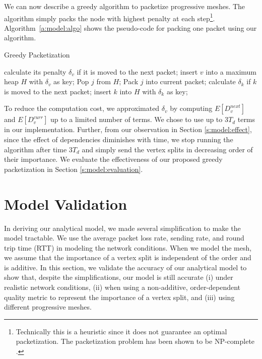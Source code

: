 We can now describe a greedy algorithm to packetize progressive meshes.
The algorithm simply packs the node with highest penalty
at each step\footnote{Technically this is a heuristic since it does not
guarantee an optimal packetization.  The packetization problem has been
shown to be NP-complete \cite{Gu:Packetization}.}.
Algorithm~\ref{a:model:algo} shows the pseudo-code for packing one packet using
our algorithm.

\begin{algorithm}
\caption{Greedy Packetization\label{a:model:algo}}
\begin{algorithmic}
    \STATE calculate its penalty $\delta_v$ if it is moved to the next packet;
    \STATE insert $v$ into a maximum heap $H$ with $\delta_v$ as key;
\ENDFOR
{}
\STATE Pop $j$ from $H$;
\STATE Pack $j$ into current packet;
    \STATE calculate $\delta_k$ if $k$ is moved to the next packet;
    \STATE insert $k$ into $H$ with $\delta_k$ as key;
\ENDFOR
\ENDWHILE
\end{algorithmic}
\end{algorithm}

To reduce the computation cost, we approximated $\delta_v$ by computing $E[D_v^{next}]$
and $E[D_v^{curr}]$ up to a limited number of terms.  We chose to use up to $3T_d$
terms in our implementation.  Further, from our observation in Section \ref{s:model:effect},
since the effect of dependencies diminishes with time, we stop running the algorithm
after time $3T_d$ and simply send the vertex splits in decreasing
order of their importance.  We evaluate the effectiveness of our proposed greedy packetization in Section \ref{s:model:evaluation}.

\section{Model Validation}
\label{s:model:experiment}

In deriving our analytical model, we made several 
simplification to make the model tractable.  We use the average
packet loss rate, sending rate, and round trip time (RTT) in modeling the network conditions.
When we model the mesh, we assume that the importance of a vertex split is 
independent of the order and is additive.  In this section, we validate the
accuracy of our analytical model to show that, despite the simplifications,
our model is still accurate (i) under realistic network conditions, (ii) when
using a non-additive, order-dependent quality metric to represent the importance
of a vertex split, and (iii) using different progressive meshes.

